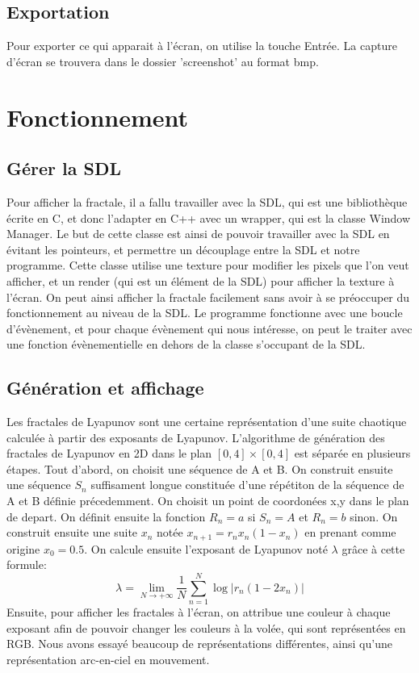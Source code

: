 \documentclass{article}
\begin{document}
	\subsection{Exportation}
	Pour exporter ce qui apparait à l'écran, on utilise la touche Entrée.
	La capture d'écran se trouvera dans le dossier 'screenshot' au format bmp.
	\section{Fonctionnement}
	\subsection{Gérer la SDL}
	Pour afficher la fractale, il a fallu travailler avec la SDL, qui est une bibliothèque écrite en C, et donc l'adapter en C++ avec un wrapper, qui est la classe Window Manager.
	Le but de cette classe est ainsi de pouvoir travailler avec la SDL en évitant les pointeurs, et permettre un découplage entre la SDL et notre programme.
	Cette classe utilise une texture pour modifier les pixels que l'on veut afficher, et un render (qui est un élément de la SDL) pour afficher la texture à l'écran.
	On peut ainsi afficher la fractale facilement sans avoir à se préoccuper du fonctionnement au niveau de la SDL.
	Le programme fonctionne avec une boucle d'évènement, et pour chaque évènement qui nous intéresse, on peut le traiter avec une fonction évènementielle en dehors de la classe s'occupant de la SDL.

	\subsection{Génération et affichage}
	Les fractales de Lyapunov sont une certaine représentation d'une suite chaotique calculée à partir des exposants de Lyapunov.
	L'algorithme de génération des fractales de Lyapunov en 2D dans le plan $[0,4] \times [0,4]$ est séparée en plusieurs étapes.
	Tout d'abord, on choisit une séquence de A et B.
	On construit ensuite une séquence $S_n$ suffisament longue constituée d'une répétiton de la séquence de A et B définie précedemment.
	On choisit un point de coordonées x,y dans le plan de depart.
	On définit ensuite la fonction $R_n = a$ si $ S_n = A $ et $R_n = b$ sinon.
	On construit ensuite une suite $x_n$ notée $x_{{n+1}}=r_{n}x_{n}(1-x_{n})$ en prenant comme origine $x_0 = 0.5$.
	On calcule ensuite l'exposant de Lyapunov noté $\lambda$ grâce à cette formule:
	\[
		\lambda = \lim_{N \to +\infty} \frac{1}{N} \sum_{n=1}^{N} \log | r_n(1-2x_n) |
	\]
	Ensuite, pour afficher les fractales à l'écran, on attribue une couleur à chaque exposant afin de pouvoir changer les couleurs à la volée, qui sont représentées en RGB.
	Nous avons essayé beaucoup de représentations différentes, ainsi qu'une représentation arc-en-ciel en mouvement.
\end{document}
